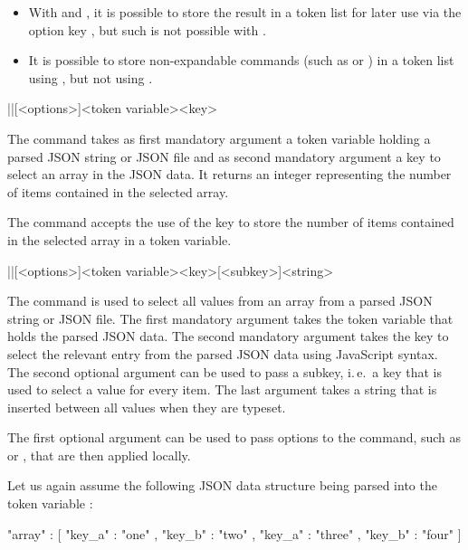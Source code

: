 \documentclass[a4paper]{article}
\begin{document}
{{\begin{itemize}
  \item With \macro{\JSONParseArrayUse} and \macro{\JSONParseArrayMapInline}, it is possible to store the result in a token list for later use via the option key , but such is not possible with \macro{\JSONParseArrayMapFunction}.
  \item It is possible to store non-expandable commands (such as \macro{\emph} or \macro{\textbf}) in a token list using \macro{\JSONParseArrayUse}, but not using \macro{\JSONParseArrayMapInline}.
\end{itemize}

\begin{macrodef}
|\JSONParseArrayCount|[<options>]{<token variable>}{<key>}
\end{macrodef}
The command \macro{\JSONParseArrayCount} takes as first mandatory argument a token variable holding a parsed JSON string or JSON file and as second mandatory argument a key to select an array in the JSON data. It returns an integer representing the number of items contained in the selected array.

The command \macro{\JSONParseArrayCount} accepts the use of the key  to store the number of items contained in the selected array in a token variable.

\begin{macrodef}
|\JSONParseArrayUse|[<options>]{<token variable>}{<key>}[<subkey>]{<string>}
\end{macrodef}
The command \macro{\JSONParseArrayUse} is used to select all values from an array from a parsed JSON string or JSON file. The first mandatory argument takes the token variable that holds the parsed JSON data. The second mandatory argument takes the key to select the relevant entry from the parsed JSON data using JavaScript syntax. The second optional argument can be used to pass a subkey, i.\,e.\ a key that is used to select a value for every item. The last argument takes a string that is inserted between all values when they are typeset.

The first optional argument can be used to pass options to the command, such as  or , that are then applied locally.

Let us again assume the following JSON data structure being parsed into the token variable \macro{\myJSONdata}:

\begin{codeexample}
{
  "array" : [
    {
      "key_a" : "one" ,
      "key_b" : "two"
    } ,
    {
      "key_a" : "three" ,
      "key_b" : "four"
    }
  ]
}
\end{codeexample}

}}
\end{document}
